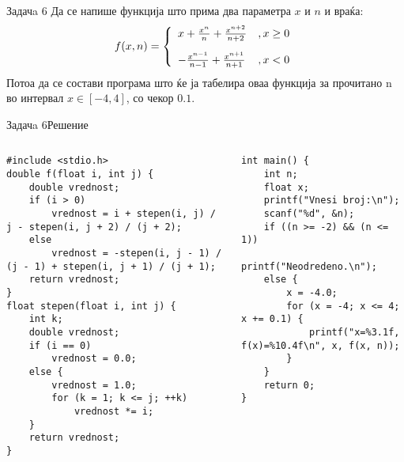 \begin{frame}{Задачa 6}
Да се напише функција што прима два параметра $x$ и $n$ и враќа:
\[
   f(x, n) = \left\{ 
  \begin{array}{l l}
    x + \frac{x^n}{n} + \frac{x^{n+2}}{n + 2} &,x\geq0\\[10px]
    - \frac{x^{n - 1}}{n - 1} + \frac{x^{n+1}}{n + 1} &,x<0
  \end{array} \right.
\]
Потоа да се состави програма што ќе ја табелира оваа функција за прочитано n во
интервал $x\in[-4, 4]$, со чекор $0.1$.
\end{frame}

\begin{frame}[fragile]{Задачa 6}{Решение}
\begin{columns}
    \begin{lstlisting}
#include <stdio.h>
double f(float i, int j) {
    double vrednost;
    if (i > 0)
        vrednost = i + stepen(i, j) / j - stepen(i, j + 2) / (j + 2);
    else
        vrednost = -stepen(i, j - 1) / (j - 1) + stepen(i, j + 1) / (j + 1);
    return vrednost;
}
float stepen(float i, int j) {
    int k;
    double vrednost;
    if (i == 0)
        vrednost = 0.0;
    else {
        vrednost = 1.0;
        for (k = 1; k <= j; ++k)
            vrednost *= i;
    }
    return vrednost;
}
\end{lstlisting}
\begin{lstlisting}
int main() {
    int n;
    float x;
    printf("Vnesi broj:\n");
    scanf("%d", &n);
    if ((n >= -2) && (n <= 1))
        printf("Neodredeno.\n");
    else {
        x = -4.0;
        for (x = -4; x <= 4; x += 0.1) {
            printf("x=%3.1f, f(x)=%10.4f\n", x, f(x, n));
        }
    }
    return 0;
}
\end{lstlisting}
\end{columns}
\end{frame}

